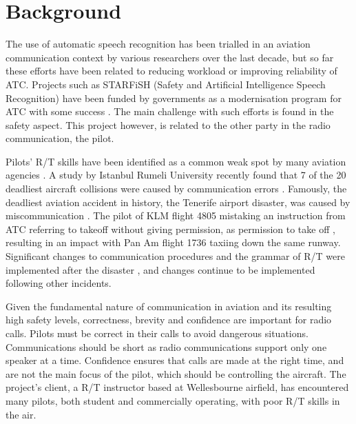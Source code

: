 \section{Background}
\label{sec:background}
The use of automatic speech recognition has been trialled in an aviation communication context by various researchers over the last decade, but so far these efforts have been related to reducing workload or improving reliability of ATC. Projects such as STARFiSH (Safety and Artificial Intelligence Speech Recognition) have been funded by governments as a modernisation program for ATC with some success \cite{STARFiSH}. The main challenge with such efforts is found in the safety aspect. This project however, is related to the other party in the radio communication, the pilot.


Pilots' R/T skills have been identified as a common weak spot by many aviation agencies \cite{flight-safety-failure-to-communicate}. A study by Istanbul Rumeli University recently found that 7 of the 20 deadliest aircraft collisions were caused by communication errors \cite{communication-in-accidents}. Famously, the deadliest aviation accident in history, the Tenerife airport disaster, was caused by miscommunication \cite{tenerife-accident-description}. The pilot of KLM flight 4805 mistaking an instruction from ATC referring to takeoff without giving permission, as permission to take off \cite{tenerife-accident-description}, resulting in an impact with Pan Am flight 1736 taxiing down the same runway. Significant changes to communication procedures and the grammar of R/T were implemented after the disaster \cite{CAP413-ed15-ch2-p6}, and changes continue to be implemented following other incidents.

Given the fundamental nature of communication in aviation and its resulting high safety levels, correctness, brevity and confidence are important for radio calls. Pilots must be correct in their calls to avoid dangerous situations. Communications should be short as radio communications support only one speaker at a time. Confidence ensures that calls are made at the right time, and are not the main focus of the pilot, which should be controlling the aircraft. The project's client, a R/T instructor based at Wellesbourne airfield, has encountered many pilots, both student and commercially operating, with poor R/T skills in the air.

